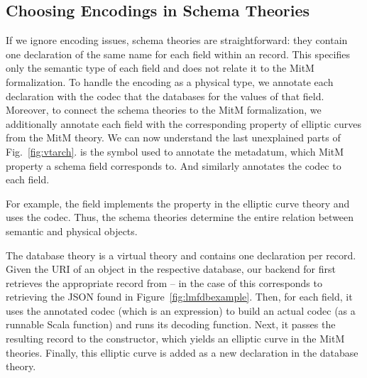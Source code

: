\subsection{Choosing Encodings in Schema Theories}\label{sec:vt:schema}

If we ignore encoding issues, schema theories are straightforward: they contain one declaration of the same name for each field within an \lmfdb record. 
This specifies only the semantic type of each field and does not relate it to the MitM formalization.
To handle the encoding as a physical type, we annotate each declaration with the codec that the databases for the values of that field.
Moreover, to connect the schema theories to the MitM formalization, we additionally annotate each field with the corresponding property of elliptic curves from the MitM theory.
We can now understand the last unexplained parts of Fig.~\ref{fig:vtarch}.
 is the symbol used to annotate the metadatum, which MitM property a schema field corresponds to.
And  similarly annotates the codec to each field.

For example, the  field implements the  property in the elliptic curve theory and uses the  codec.
Thus, the schema theories determine the entire relation between semantic and physical objects.

The database theory is a virtual theory and contains one declaration per \lmfdb record.
Given the URI of an object in the respective database, our \mmt backend for \lmfdb first retrieves the appropriate record from {\lmfdb} -- in the case of  this corresponds to retrieving the JSON found in Figure~\ref{fig:lmfdbexample}. 
Then, for each field, it uses the annotated codec (which is an \ommt expression) to build an actual codec (as a runnable Scala function) and runs its decoding function.
Next, it passes the resulting record to the  constructor, which yields an elliptic curve in the MitM theories.
Finally, this elliptic curve is added as a new declaration in the database theory.



